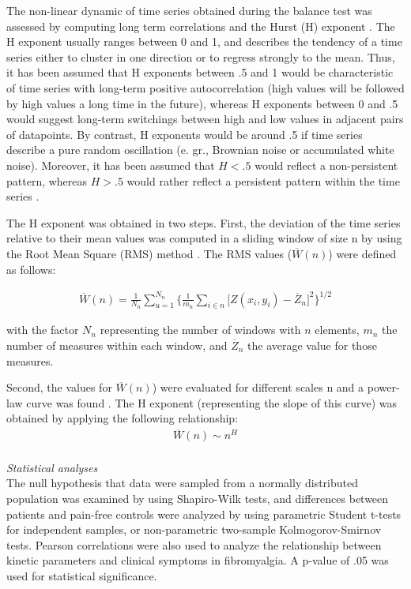 \documentclass[12pt]{article}
\begin{document}
The non-linear dynamic of time series obtained during the balance test was assessed by computing long term correlations and the Hurst (H) exponent \cite{feder1988fractals}. The H exponent usually ranges between 0 and 1, and describes the tendency of a time series either to cluster in one direction or to regress strongly to the mean. Thus, it has been assumed that H exponents between .5 and 1 would be characteristic of time series with long-term positive autocorrelation (high values will be followed by high values a long time in the future), whereas H exponents between 0 and .5 would suggest long-term switchings between high and low values in adjacent pairs of datapoints. By contrast, H exponents would be around .5 if time series describe a pure random oscillation (e. gr., Brownian noise or accumulated white noise). Moreover, it has been assumed that $H < .5$ would reflect a non-persistent pattern, whereas $H > .5$ would rather reflect a persistent pattern within the time series \cite{feder1988fractals}. 

The H exponent was obtained in two steps. First, the deviation of the time series relative to their mean values was computed in a sliding window of size n by using the Root Mean Square (RMS) method \cite{russ1994fractal}. The RMS values ($\overline{W}(n)$) were defined as follows:

\begin{eqnarray}
\overline{W}(n) = \frac{1}{N_{n}} \sum_{u=1}^{N_{n}} \bigg \{ \frac{1}{m_{n}} \sum_{i \in n} \bigg[ Z(x_{i}, y_{i}) - \overline{Z}_{n} \bigg]^{2} \bigg\}^{1/2}
\end{eqnarray}

with the factor $N_{n}$ representing the number of windows with $n$  elements, $m_{n}$  the number of measures within each window, and  $\overline{Z}_{n}$ the average value for those measures. 

Second, the values for $\overline{W}(n)$) were evaluated for different scales n and a power-law curve was found  \cite{feder1988fractals, russ1994fractal}. The H exponent (representing the slope of this curve) was obtained by applying the following relationship:
\begin{eqnarray}
\overline{W}(n) \sim n^{H}
\end{eqnarray}
\\
\emph{Statistical analyses}\\
The null hypothesis that data were sampled from a normally distributed population was examined by using Shapiro-Wilk tests, and differences between patients and pain-free controls were analyzed by using parametric Student t-tests for independent samples, or non-parametric two-sample Kolmogorov-Smirnov tests. Pearson correlations were also used to analyze the relationship between kinetic parameters and clinical symptoms in fibromyalgia. A p-value of .05 was used for statistical significance.\\
\end{document}
